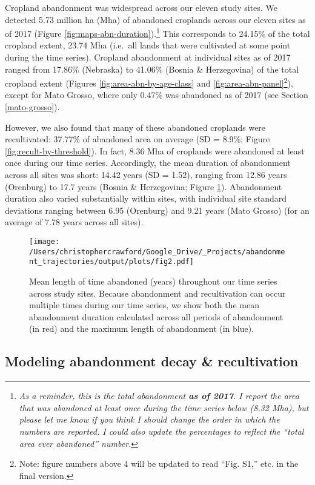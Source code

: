 \documentclass[9pt,twocolumn,twoside,]{pnas-new}
\begin{document}
Cropland abandonment was widespread across our eleven study sites.
We detected 5.73 million ha (Mha) of abandoned croplands across our eleven sites as of 2017 (Figure \ref{fig:maps-abn-duration}).\footnote{\emph{As a reminder, this is the total abandonment \textbf{as of 2017}. I report the area that was abandoned at least once during the time series below (8.32 Mha), but please let me know if you think I should change the order in which the numbers are reported. I could also update the percentages to reflect the ``total area ever abandoned'' number.}}
This corresponds to 24.15\% of the total cropland extent, 23.74 Mha (i.e.~all lands that were cultivated at some point during the time series).
Cropland abandonment at individual sites as of 2017 ranged from 17.86\% (Nebraska) to 41.06\% (Bosnia \& Herzegovina) of the total cropland extent (Figures \ref{fig:area-abn-by-age-class} and \ref{fig:area-abn-panel}\footnote{Note: figure numbers above 4 will be updated to read ``Fig. S1,'' etc. in the final version.}), except for Mato Grosso, where only 0.47\% was abandoned as of 2017 (see Section \ref{mato-grosso}).

However, we also found that many of these abandoned croplands were recultivated: 37.77\% of abandoned area on average (SD = 8.9\%; Figure \ref{fig:recult-by-threshold}).
In fact, 8.36 Mha of croplands were abandoned at least once during our time series.
Accordingly, the mean duration of abandonment across all sites was short: 14.42 years (SD = 1.52), ranging from 12.86 years (Orenburg) to 17.7 years (Bosnia \& Herzegovina; Figure \ref{fig:mean-abn-duration}).
Abandonment duration also varied substantially within sites, with individual site standard deviations ranging between 6.95 (Orenburg) and 9.21 years (Mato Grosso) (for an average of 7.78 years across all sites).

\begin{figure}
\centering
\texttt{[image: /Users/christophercrawford/Google\_Drive/\_Projects/abandonment\_trajectories/output/plots/fig2.pdf]}
\caption{\label{fig:mean-abn-duration}Mean length of time abandoned (years) throughout our time series across study sites. Because abandonment and recultivation can occur multiple times during our time series, we show both the mean abandonment duration calculated across all periods of abandonment (in red) and the maximum length of abandonment (in blue).}
\end{figure}

\hypertarget{modeling-abandonment-decay-recultivation}{%
\subsection{Modeling abandonment decay \& recultivation}\label{modeling-abandonment-decay-recultivation}}
\end{document}
